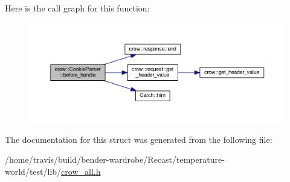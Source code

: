 Here is the call graph for this function\-:
\nopagebreak
\begin{figure}[H]
\begin{center}
\leavevmode
\includegraphics[width=350pt]{structcrow_1_1_cookie_parser_a85053375273cc6a217136315cfe9d181_cgraph}
\end{center}
\end{figure}




The documentation for this struct was generated from the following file\-:\begin{DoxyCompactItemize}
\item 
/home/travis/build/bender-\/wardrobe/\-Recast/temperature-\/world/test/lib/\hyperlink{crow__all_8h}{crow\-\_\-all.\-h}\end{DoxyCompactItemize}
